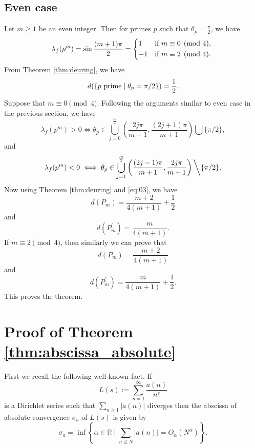 \documentclass[12pt,a4paper,reqno]{amsart}
\begin{document}
\subsection{Even case}
Let $m\ge 1$ be an even integer. Then for primes $p$ such that $\theta_p=\frac{\pi}{2}$, we have 
\begin{equation*}
\lambda_f(p^m)= \sin{\frac{(m+1)\pi}{2}}=
    \begin{cases*}
      1 & if $m\equiv 0\pmod 4$, \\
      -1       & if $m\equiv 2\pmod 4$.
    \end{cases*}
  \end{equation*}
  From Theorem \ref{thm:deuring}, we have 
  \begin{equation}\label{eq:03}
  d(\{p \ {\rm prime} \mid \theta_p=\pi/2\}) = \frac{1}{2}.
  \end{equation}
  Suppose that $m\equiv 0 \pmod{4}$. 
  Following the arguments similar to even case in the previous section, we have 
$$
\lambda_f(p^m)>0  \iff 
 \theta_p \in \bigcup_{j=0}^{\frac{m}{2}}\left(\frac{2j\pi}{m+1}, \frac{(2j+1)\pi}{m+1}\right) 
 \bigcup \{\pi/2\},
 $$
and
$$
\lambda_f(p^m)<0 \iff 
 \theta_p \in \bigcup_{j=1}^{\frac{m}{2}}\left(\frac{(2j-1)\pi}{m+1}, \frac{2j\pi}{m+1}\right) 
 \bigg\backslash \{\pi/2\}.
$$
Now using Theorem \ref{thm:deuring} and \eqref{eq:03}, we have
$$
d(P_m)=\frac{m+2}{4(m+1)}+\frac{1}{2}
$$
and 
$$
 d(P^{'}_m)=\frac{m}{4(m+1)}.
$$
If $m\equiv 2 \pmod{4}$, then similarly we can prove that 
$$
d(P_m)=\frac{m+2}{4(m+1)}
$$
and 
$$
 d(P^{'}_m)=\frac{m}{4(m+1)} +\frac{1}{2}.
$$
This proves the theorem.

   
    
      
       
   
  
   
    
    
      
   
 
  
\section{Proof of Theorem \ref{thm:abscissa_absolute}}\label{abscissa}
First we recall the following well-known fact. If 
$$L(s) := \sum_{n=1}^{\infty} \frac{a(n)} {n^s}$$
is a Dirichlet series such that $\sum_{n \geq 1} | a(n) |$ diverges then 
the abscissa of absolute convergence 
$\sigma_{a}$ of 
$L(s)$ is given by
\begin{equation}\label{eq:4}
\sigma_a= \inf \left\{\alpha \in \mathbb{R} \mid \sum_{n \leq N} \vert a(n) 
\vert = O_\alpha(N^\alpha) \right\}.
\end{equation} 
\end{document}

